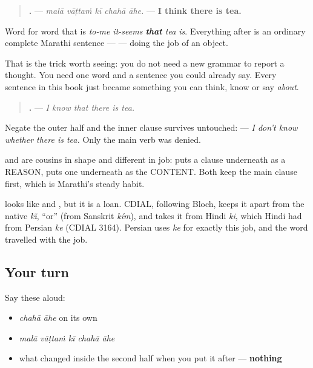 \begin{grammarlens}[title={Grammar Lens: \mr{की} opens the room where the thought goes}]
\begin{quote}
\textbf{    .} — \emph{malā vāṭtaṁ kī chahā āhe.} — \textbf{I think there is tea.}
\end{quote}

Word for word that is \emph{to-me it-seems \textbf{that} tea is}. Everything after \textbf{} is an ordinary complete Marathi sentence — \textbf{ } — doing the job of an object.

That is the trick worth seeing: you do not need a new grammar to report a thought. You need one word and a sentence you could already say. Every sentence in this book just became something you can think, know or say \emph{about}.

\begin{quote}
\textbf{     .} — \emph{I know that there is tea.}
\end{quote}

Negate the outer half and the inner clause survives untouched: \textbf{     } — \emph{I don't know whether there is tea.} Only the main verb was denied.

\textbf{} and \textbf{} are cousins in shape and different in job: \textbf{} puts a clause underneath as a REASON, \textbf{} puts one underneath as the CONTENT. Both keep the main clause first, which is Marathi's steady habit.

\textbf{} looks like \textbf{} and \textbf{}, but it is a loan. CDIAL, following Bloch, keeps it apart from the native \emph{kī̃}, \textquotedblleft{}or\textquotedblright{} (from Sanskrit \emph{kím}), and takes it from Hindi \emph{ki}, which Hindi had from Persian \emph{ke} (CDIAL 3164). Persian uses \emph{ke} for exactly this job, and the word travelled with the job.
\end{grammarlens}

\subsection*{Your turn}
Say these aloud:

\begin{itemize}
\raggedright
  \item \emph{chahā āhe} on its own
  \item \emph{malā vāṭtaṁ kī chahā āhe}
  \item what changed inside the second half when you put it after \textbf{} — \textbf{nothing}
\end{itemize}

